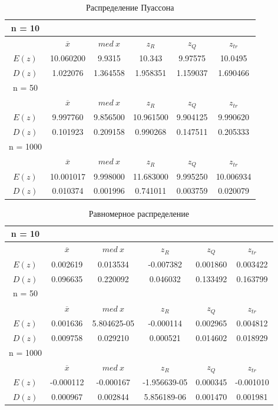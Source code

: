 \documentclass[12pt,a4paper]{article}
\begin{document}
	\begin{table}[h!]
		\centering
		\begin{tabular}{ |c|c|c|c|c|c| }
			\hline
			n = 10 & & & & & \\
			\hline
			&$\overline{x}$ & $med\ x$ & $z_{R}$ & $z_{Q}$ & $z_{tr}$\\
			\hline
			$E(z)$ & 10.060200 & 9.9315 & 10.343 & 9.97575 & 10.0495 \\
			\hline
			$D(z) $ & 1.022076 & 1.364558 & 1.958351 & 1.159037 & 1.690466 \\
			\hline\hline
			n = 50 & & & & & \\
			\hline
			&$\overline{x}$ & $med\ x$ & $z_{R}$ & $z_{Q}$ & $z_{tr}$\\
			\hline
			$E(z)$ & 9.997760 & 9.856500 & 10.961500 & 9.904125 & 9.990620 \\
			\hline
			$D(z)$ & 0.101923 & 0.209158 & 0.990268 & 0.147511 & 0.205333 \\
			\hline\hline
			n = 1000 & & & & & \\
			\hline
			&$\overline{x}$ & $med\ x$ & $z_{R}$ & $z_{Q}$ & $z_{tr}$\\
			\hline
			$E(z)$ & 10.001017 & 9.998000 & 11.683000 & 9.995250 & 10.006934 \\
			\hline
			$D(z)$ & 0.010374 & 0.001996 & 0.741011 & 0.003759 & 0.020079 \\
			\hline
		\end{tabular}
		\caption{Распределение Пуассона}
		\label{table:4}
	\end{table}

	\begin{table}[h!]
		\centering
		\begin{tabular}{ |c|c|c|c|c|c| }
			\hline
			n = 10 & & & & & \\
			\hline
			&$\overline{x}$ & $med\ x$ & $z_{R}$ & $z_{Q}$ & $z_{tr}$\\
			\hline
			$E(z)$ & 0.002619 & 0.013534 & -0.007382 & 0.001860 & 0.003422 \\
			\hline
			$D(z) $ & 0.096635 & 0.220092 & 0.046032 & 0.133492 & 0.163799 \\
			\hline\hline
			n = 50 & & & & & \\
			\hline
			&$\overline{x}$ & $med\ x$ & $z_{R}$ & $z_{Q}$ & $z_{tr}$\\
			\hline
			$E(z)$ & 0.001636 & 5.804625-05 & -0.000114 & 0.002965 & 0.004812 \\
			\hline
			$D(z)$ & 0.009758 & 0.029210 & 0.000521 & 0.014602 & 0.018929 \\
			\hline\hline
			n = 1000 & & & & & \\
			\hline
			&$\overline{x}$ & $med\ x$ & $z_{R}$ & $z_{Q}$ & $z_{tr}$\\
			\hline
			$E(z)$ & -0.000112 & -0.000167 & -1.956639-05 & 0.000345 & -0.001010 \\
			\hline
			$D(z)$ & 0.000967 & 0.002844 & 5.856189-06 & 0.001470 & 0.001981 \\
			\hline
		\end{tabular}
		\caption{Равномерное распределение}
		\label{table:5}
	\end{table}
\end{document}
